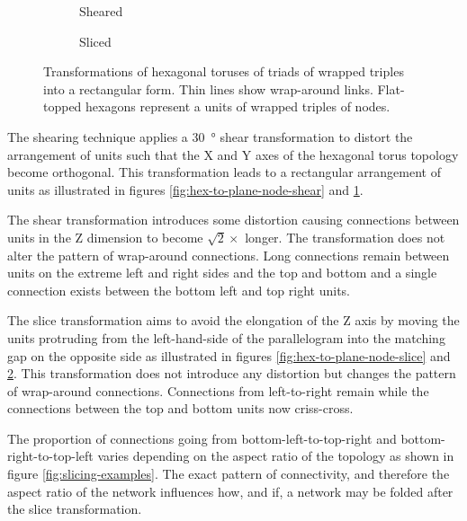 \begin{figure}
\begin{subfigure}[b]{0.32\linewidth}
					\caption{Sheared}
					\label{fig:hex-to-plane-shear}
				\end{subfigure}
				\begin{subfigure}[b]{0.32\linewidth}
					\center
					
					\caption{Sliced}
					\label{fig:hex-to-plane-slice}
				\end{subfigure}
				
				\caption{Transformations of hexagonal toruses of triads of wrapped
				triples into a rectangular form. Thin lines show wrap-around links.
				Flat-topped hexagons represent a units of wrapped triples of nodes.}
				\label{fig:hex-to-plane}
			\end{figure}
			
			The shearing technique applies a \SI{30}{\degree} shear transformation to
			distort the arrangement of units such that the X and Y axes of the
			hexagonal torus topology become orthogonal. This transformation leads to
			a rectangular arrangement of units as illustrated in figures
			\ref{fig:hex-to-plane-node-shear} and \ref{fig:hex-to-plane-shear}.
			
			The shear transformation introduces some distortion causing connections
			between units in the Z dimension to become $\sqrt{2} \times$ longer. The
			transformation does not alter the pattern of wrap-around connections.
			Long connections remain between units on the extreme left and right sides
			and the top and bottom and a single connection exists between the bottom
			left and top right units.
			
			The slice transformation aims to avoid the elongation of the Z axis by
			moving the units protruding from the left-hand-side of the parallelogram
			into the matching gap on the opposite side as illustrated in figures
			\ref{fig:hex-to-plane-node-slice} and \ref{fig:hex-to-plane-slice}. This
			transformation does not introduce any distortion but changes the pattern
			of wrap-around connections. Connections from left-to-right remain while
			the connections between the top and bottom units now criss-cross.
			
			The proportion of connections going from bottom-left-to-top-right and
			bottom-right-to-top-left varies depending on the aspect ratio of the
			topology as shown in figure \ref{fig:slicing-examples}. The exact pattern
			of connectivity, and therefore the aspect ratio of the network influences
			how, and if, a network may be folded after the slice transformation.
			
